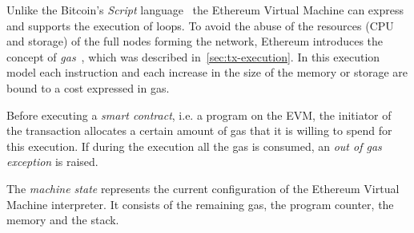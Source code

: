 Unlike the Bitcoin's \emph{Script} language~\cite{bib:masteringbitcoin} the
Ethereum Virtual Machine can express and supports the execution of loops. To
avoid the abuse of the resources (CPU and storage) of the full nodes forming the
network, Ethereum introduces the concept of \emph{gas}~\cite{wood2018ethereum},
which was described in~\autoref{sec:tx-execution}. In this execution model each
instruction and each increase in the size of the memory or storage are bound to
a cost expressed in gas.


Before executing a \emph{smart contract}, i.e. a program on the EVM, the
initiator of the transaction allocates a certain amount of gas that it is
willing to spend for this execution. If during the execution all the gas is
consumed, an \emph{out of gas exception} is raised.


The \emph{machine state} represents the current configuration of the Ethereum
Virtual Machine interpreter. It consists of the remaining gas, the program
counter, the memory and the stack.

